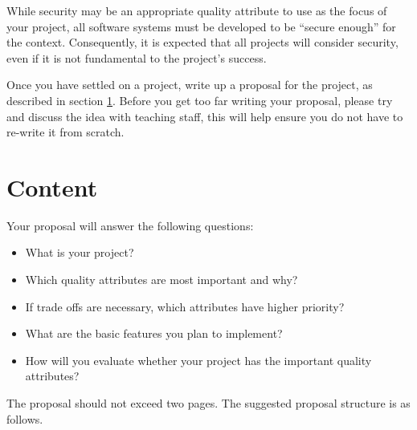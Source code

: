 \documentclass{csse4400}
\begin{document}
\noindent
While security may be an appropriate quality attribute to use as the focus of your project,
all software systems must be developed to be ``secure enough'' for the context.
Consequently, it is expected that all projects will consider security,
even if it is not fundamental to the project's success.

Once you have settled on a project, write up a proposal for the project, as described in section \ref{sect:content}.
Before you get too far writing your proposal,
please try and discuss the idea with teaching staff,
this will help ensure you do not have to re-write it from scratch.


\section{Content}\label{sect:content}
Your proposal will answer the following questions:
\begin{itemize}
    \item What is your project?
    \item Which quality attributes are most important and why?
    \item If trade offs are necessary, which attributes have higher priority?
    \item What are the basic features you plan to implement?
    \item How will you evaluate whether your project has the important quality attributes?
\end{itemize}

\noindent
The proposal should not exceed two pages.
The suggested proposal structure is as follows.
\end{document}
